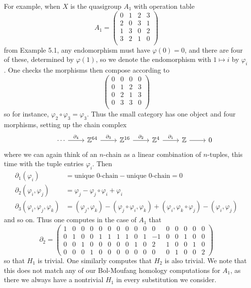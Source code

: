 \documentclass[11pt]{amsart}
\theoremstyle{definition}
\newcommand{\Z}{\mathbb{Z}}
\begin{document}
For example, when $X$ is the quasigroup $A_1$ with operation table \[ A_1 = \left(
\begin{array}{cccc}
 0 & 1 & 2 & 3 \\
 2 & 0 & 3 & 1 \\
 1 & 3 & 0 & 2 \\
 3 & 2 & 1 & 0 \\
\end{array}
\right) \] from Example 5.1, any endomorphism must have $\varphi(0) = 0$, and there are four of these, determined by $\varphi(1)$, so we denote the endomorphism with $1 \mapsto i$ by $\varphi_i$. One checks the morphisms then compose according to \[ \left(
\begin{array}{cccc}
 0 & 0 & 0 & 0 \\
 0 & 1 & 2 & 3 \\
 0 & 2 & 1 & 3 \\
 0 & 3 & 3 & 0 \\
\end{array}
\right) \] so for instance, $\varphi_2 \circ \varphi_3 = \varphi_3$. Thus the small category has one object and four morphisms, setting up the chain complex \[ \begin{tikzcd}
    & \cdots \arrow[r, "\partial_4"] & \Z^{64} \arrow[r, "\partial_3"] & \Z^{16} \arrow[r, "\partial_2"] & \Z^4 \arrow[r, "\partial_1"] & \Z \arrow[r] & 0
\end{tikzcd} \] where we can again think of an $n$-chain as a linear combination of $n$-tuples, this time with the tuple entries $\varphi_i$. Then \begin{align*}
    \partial_1(\varphi_i) &= \text{unique 0-chain} - \text{unique 0-chain} = 0 \\
    \partial_2(\varphi_i, \varphi_j) &= \varphi_j - \varphi_j \circ \varphi_i + \varphi_i \\
    \partial_3(\varphi_i, \varphi_j, \varphi_k) &= (\varphi_j, \varphi_k) - (\varphi_j \circ \varphi_i, \varphi_k) + (\varphi_i, \varphi_k \circ \varphi_j) - (\varphi_i, \varphi_j)
\end{align*} and so on. Thus one computes in the case of $A_1$ that \[ \partial_2 = \begin{pmatrix}
    1 & 0 & 0 & 0 & 0 & 0 & 0 & 0 & 0 & 0 & 0 & 0 & 0 & 0 & 0 & 0 \\
    0 & 1 & 0 & 0 & 1 & 1 & 1 & 1 & 0 & 1 & -1 & 0 & 0 & 1 & 0 & 0 \\
    0 & 0 & 1 & 0 & 0 & 0 & 0 & 0 & 1 & 0 & 2 & 1 & 0 & 0 & 1 & 0 \\
    0 & 0 & 0 & 1 & 0 & 0 & 0 & 0 & 0 & 0 & 0 & 0 & 1 & 0 & 0 & 2
\end{pmatrix} \] so that $H_1$ is trivial. One similarly computes that $H_2$ is also trivial. We note that this does not match any of our Bol-Moufang homology computations for $A_1$, as there we always have a nontrivial $H_1$ in every substitution we consider. 
\end{document}
